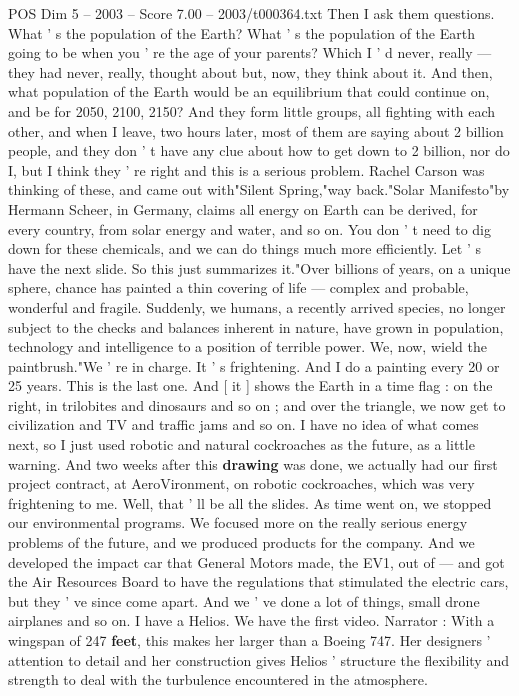 \begin{textsample}{POS Dim 5 – 2003 – Score 7.00 – 2003/t000364.txt}
Then I ask them questions.
What ' s the population of the Earth?
What ' s the population of the Earth going to be when you ' re the age of your parents?
Which I ' d never, really — they had never, really, thought about but, now, they think about it.
And then, what population of the Earth would be an equilibrium that could continue on, and be for 2050, 2100, 2150?
And they form little groups, all fighting with each other, and when I leave, two hours later, most of them are saying about 2 billion people, and they don ' t have any clue about how to get down to 2 billion, nor do I, but I think they ' re right and this is a serious problem.
Rachel Carson was thinking of these, and came out with"Silent Spring,"way back."Solar Manifesto"by Hermann Scheer, in Germany, claims all energy on Earth can be derived, for every country, from solar energy and water, and so on.
You don ' t need to dig down for these chemicals, and we can do things much more efficiently.
Let ' s have the next slide.
So this just summarizes it."Over billions of years, on a unique sphere, chance has painted a thin covering of life — complex and probable, wonderful and fragile.
Suddenly, we humans, a recently arrived species, no longer subject to the checks and balances inherent in nature, have grown in population, technology and intelligence to a position of terrible power.
We, now, wield the paintbrush."We ' re in charge.
It ' s frightening.
And I do a painting every 20 or 25 years.
This is the last one.
And [ it ] shows the Earth in a time flag : on the right, in trilobites and dinosaurs and so on ; and over the triangle, we now get to civilization and TV and traffic jams and so on.
I have no idea of what comes next, so I just used robotic and natural cockroaches as the future, as a little warning.
And two weeks after this \textbf{drawing} was done, we actually had our first project contract, at AeroVironment, on robotic cockroaches, which was very frightening to me.
Well, that ' ll be all the slides.
As time went on, we stopped our environmental programs.
We focused more on the really serious energy problems of the future, and we produced products for the company.
And we developed the impact car that General Motors made, the EV1, out of — and got the Air Resources Board to have the regulations that stimulated the electric cars, but they ' ve since come apart.
And we ' ve done a lot of things, small drone airplanes and so on.
I have a Helios.
We have the first video.
Narrator : With a wingspan of 247 \textbf{feet}, this makes her larger than a Boeing 747.
Her designers ' attention to detail and her construction gives Helios ' structure the flexibility and strength to deal with the turbulence encountered in the atmosphere.

\end{textsample}
